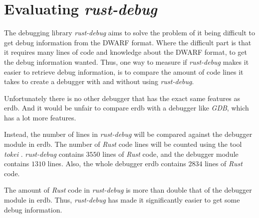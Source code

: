 
\section{Evaluating \emph{rust-debug}} \label{sec:evalrd}
The debugging library \emph{rust-debug} aims to solve the problem of it being difficult to get debug information from the \gls{DWARF} format.
Where the difficult part is that it requires many lines of code and knowledge about the \gls{DWARF} format, to get the debug information wanted.
Thus, one way to measure if \emph{rust-debug} makes it easier to retrieve debug information, is to compare the amount of code lines it takes to create a debugger with and without using \emph{rust-debug}.


Unfortunately there is no other debugger that has the exact same features as \gls{erdb}.
And it would be unfair to compare \gls{erdb} with a debugger like \emph{GDB}, which has a lot more features.


Instead, the number of lines in \emph{rust-debug} will be compared against the debugger module in \gls{erdb}.
The number of \emph{Rust} code lines will be counted using the tool \emph{tokei} \cite{tokei}.
\emph{rust-debug} contains $3550$ lines of \emph{Rust} code, and the debugger module contains $1310$ lines.
Also, the whole debugger \gls{erdb} contains $2834$ lines of \emph{Rust} code.


The amount of \emph{Rust} code in \emph{rust-debug} is more than double that of the debugger module in \gls{erdb}.
Thus, \emph{rust-debug} has made it significantly easier to get some debug information.



